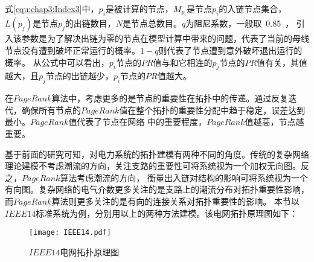 式\ref{equ:chap3:Index3}中，$p_i$是被计算的节点，$M_{p_i}$是节点$p_i$的入链节点集合，$L(p_j)$是节点$p_j$的出链数目，$N$是节点总数目。$q$为阻尼系数，一般取~0.85~，
引入该参数是为了解决出链为零的节点在模型计算中带来的问题，代表了当前的母线节点没有遭到破坏正常运行的概率。$1-q$则代表了节点遭到意外破坏退出运行的概率。
从公式中可以看出，$p_i$节点的$PR$值与和它相连的$p_j$节点的$PR$值有关，其值越大，且$p_j$节点的出链越少，$p_i$节点的$PR$值越大。

在$PageRank$算法中，考虑更多的是节点的重要性在拓扑中的传递。通过反复迭代，确保所有节点的$PageRank$值在整个拓扑的重要性分配中趋于稳定，误差达到最小。$PageRank$值代表了节点在网络
中的重要程度，$PageRank$值越高，节点越重要。

基于前面的研究可知，对电力系统的拓扑建模有两种不同的角度。传统的复杂网络理论建模不考虑潮流的方向，关注支路的重要性可将系统视为一个加权无向图。反之，$PageRank$算法考虑潮流的方向，
衡量出入链对结构的影响可将系统视为一个有向图。复杂网络的电气介数更多关注的是支路上的潮流分布对拓扑重要性影响，而$PageRank$算法则更多关注的是有向的连接关系对拓扑重要性的影响。
本节以$IEEE14$标准系统为例，分别用以上的两种方法建模。该电网拓扑原理图如下：
\begin{figure}[H] %
  \centering
  \texttt{[image: IEEE14.pdf]}
  \caption{$IEEE14$电网拓扑原理图}
  \label{fig:fundement14}
\end{figure}

